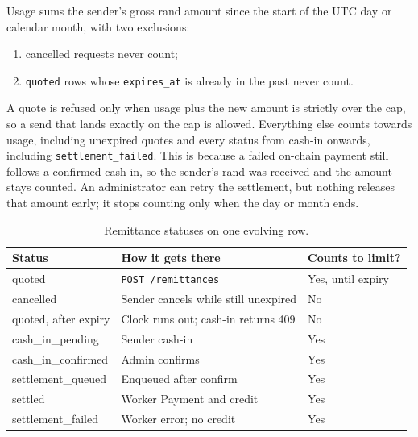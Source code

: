 \documentclass[11pt,a4paper]{article}
\newcommand{\code}[1]{\texttt{\small #1}}
\begin{document}
Usage sums the sender's gross rand amount since the start of the UTC day or calendar month, with two exclusions:
\begin{enumerate}
  \item cancelled requests never count;
  \item \code{quoted} rows whose \code{expires\_at} is already in the past never count.
\end{enumerate}

A quote is refused only when usage plus the new amount is strictly over the cap, so a send that lands exactly on the cap is allowed. Everything else counts towards usage, including unexpired quotes and every status from cash-in onwards, including \code{settlement\_failed}. This is because a failed on-chain payment still follows a confirmed cash-in, so the sender's rand was received and the amount stays counted. An administrator can retry the settlement, but nothing releases that amount early; it stops counting only when the day or month ends.

\begin{table}[H]
\centering\small
{}
\begin{tabular}{@{}>{\ttfamily}l l l@{}}
\toprule
\rowcolor{headbg}\textbf{Status} & \textbf{How it gets there} & \textbf{Counts to limit?} \\
\midrule
quoted               & \code{POST /remittances}                          & Yes, until expiry \\
cancelled            & Sender cancels while still unexpired              & No \\
quoted, after expiry & Clock runs out; cash-in returns 409               & No \\
cash\_in\_pending    & Sender cash-in                                    & Yes \\
cash\_in\_confirmed  & Admin confirms                                    & Yes \\
settlement\_queued   & Enqueued after confirm                            & Yes \\
settled              & Worker Payment and credit                         & Yes \\
settlement\_failed   & Worker error; no credit                           & Yes \\
\bottomrule
\end{tabular}
\caption{Remittance statuses on one evolving row.}
\label{tab:statuses}
\end{table}
\end{document}
